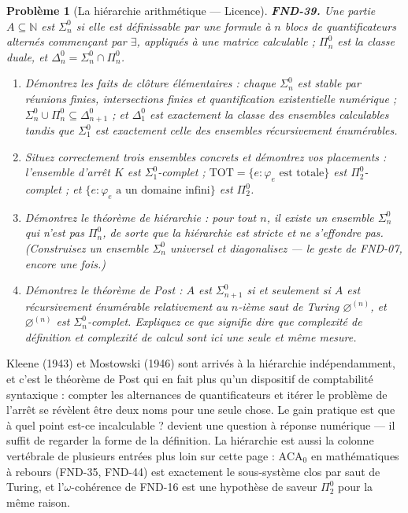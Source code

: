 \documentclass[11pt]{article}
\newtheorem{problem}{Problème}
\begin{document}
\begin{problem}[{La hiérarchie arithmétique --- Licence}]
\textbf{FND-39.} Une partie $ A \subseteq \mathbb{N} $ est $ \Sigma^0_n $ si elle est
définissable par une formule à $ n $ blocs de quantificateurs alternés commençant par
$ \exists $, appliqués à une matrice calculable ; $ \Pi^0_n $ est la classe duale, et
$ \Delta^0_n = \Sigma^0_n \cap \Pi^0_n $.
\begin{enumerate}
\item[(a)] Démontrez les faits de clôture élémentaires : chaque $ \Sigma^0_n $ est stable par réunions
finies, intersections finies et quantification existentielle numérique ; $ \Sigma^0_n \cup
\Pi^0_n \subseteq \Delta^0_{n+1} $ ; et $ \Delta^0_1 $ est exactement la classe des ensembles
calculables tandis que $ \Sigma^0_1 $ est exactement celle des ensembles récursivement
énumérables.
\item[(b)] Situez correctement trois ensembles concrets et démontrez vos placements : l'ensemble d'arrêt
$ K $ est $ \Sigma^0_1 $-complet ; $ \mathrm{TOT} = \{ e : \varphi_e \text{ est totale} \} $
est $ \Pi^0_2 $-complet ; et $ \{ e : \varphi_e \text{ a un domaine infini} \} $ est
$ \Pi^0_2 $.
\item[(c)] Démontrez le théorème de hiérarchie : pour tout $ n $, il existe un ensemble
$ \Sigma^0_{n} $ qui n'est pas $ \Pi^0_{n} $, de sorte que la hiérarchie est stricte et ne
s'effondre pas. (Construisez un ensemble $ \Sigma^0_n $ universel et diagonalisez --- le geste de
FND-07, encore une fois.)
\item[(d)] Démontrez le théorème de Post : $ A $ est $ \Sigma^0_{n+1} $ si et seulement si $ A $
est récursivement énumérable relativement au $ n $-ième saut de Turing $ \varnothing^{(n)} $,
et $ \varnothing^{(n)} $ est $ \Sigma^0_n $-complet. Expliquez ce que signifie dire que
complexité de définition et complexité de calcul sont ici une seule et même mesure.
\end{enumerate}

\end{problem}

\noindent Kleene (1943) et Mostowski (1946) sont arrivés à la hiérarchie indépendamment,
et c'est le théorème de Post qui en fait plus qu'un dispositif de comptabilité syntaxique :
compter les alternances de quantificateurs et itérer le problème de l'arrêt se révèlent être deux
noms pour une seule chose. Le gain pratique est que \og{} à quel point est-ce incalculable ? \fg{} devient
une question à réponse numérique --- il suffit de regarder la forme de la définition. La hiérarchie
est aussi la colonne vertébrale de plusieurs entrées plus loin sur cette page : $ \mathrm{ACA}_0 $
en mathématiques à rebours (FND-35, FND-44) est exactement le sous-système clos par saut de
Turing, et l'$ \omega $-cohérence de FND-16 est une hypothèse de saveur $ \Pi^0_2 $ pour la
même raison.
\end{document}
